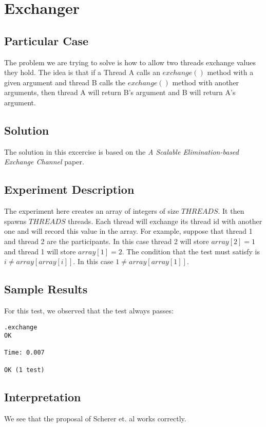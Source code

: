 \section{\textbf{Exchanger}}
\subsection{Particular Case}
\par
The problem we are trying to solve is how to allow two threads exchange values
they hold. The idea is that if a Thread A calls an $exchange()$ method with a given
argument and thread B calls the $exchange()$ method with another arguments, then
thread A will return B's argument and B will return A's argument.
\par
\subsection{Solution}
\par
The solution in this excercise is based on the \textit{A Scalable
Elimination-based Exchange Channel} paper. 
\par
\subsection{Experiment Description}
\par
The experiment here creates an array of integers of size $THREADS$. It then
spawns $THREADS$ threads. Each thread will exchange its thread id with another
one and will record this value in the array. For example, suppose that thread 1
and thread 2 are the participants. In this case thread 2 will store $array[2]=1$
and thread 1 will store $array[1]=2$. The condition that the test must satisfy
is $i \neq array[array[i]]$. In this case $1 \neq
array[array[1]]$. 
\par
\subsection{Sample Results}
\par
For this test, we observed that the test always passes:
\par
\begin{verbatim}
.exchange
OK

Time: 0.007

OK (1 test)
\end{verbatim}
\par
\subsection{Interpretation}
We see that the proposal of Scherer et. al works correctly.
